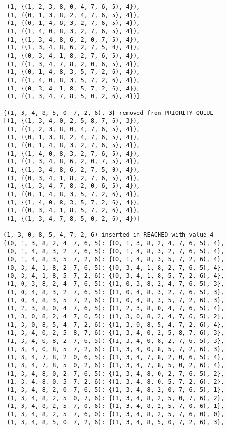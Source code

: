 \documentclass{article}
\begin{document}
\begin{verbatim}
 (1, {(1, 2, 3, 8, 0, 4, 7, 6, 5), 4}),
 (1, {(0, 1, 3, 8, 2, 4, 7, 6, 5), 4}),
 (1, {(0, 1, 4, 8, 3, 2, 7, 6, 5), 4}),
 (1, {(1, 4, 0, 8, 3, 2, 7, 6, 5), 4}),
 (1, {(1, 3, 4, 8, 6, 2, 0, 7, 5), 4}),
 (1, {(1, 3, 4, 8, 6, 2, 7, 5, 0), 4}),
 (1, {(0, 3, 4, 1, 8, 2, 7, 6, 5), 4}),
 (1, {(1, 3, 4, 7, 8, 2, 0, 6, 5), 4}),
 (1, {(0, 1, 4, 8, 3, 5, 7, 2, 6), 4}),
 (1, {(1, 4, 0, 8, 3, 5, 7, 2, 6), 4}),
 (1, {(0, 3, 4, 1, 8, 5, 7, 2, 6), 4}),
 (1, {(1, 3, 4, 7, 8, 5, 0, 2, 6), 4})]
---
{(1, 3, 4, 8, 5, 0, 7, 2, 6), 3} removed from PRIORITY QUEUE
[(1, {(1, 3, 4, 0, 2, 5, 8, 7, 6), 3}),
 (1, {(1, 2, 3, 8, 0, 4, 7, 6, 5), 4}),
 (1, {(0, 1, 3, 8, 2, 4, 7, 6, 5), 4}),
 (1, {(0, 1, 4, 8, 3, 2, 7, 6, 5), 4}),
 (1, {(1, 4, 0, 8, 3, 2, 7, 6, 5), 4}),
 (1, {(1, 3, 4, 8, 6, 2, 0, 7, 5), 4}),
 (1, {(1, 3, 4, 8, 6, 2, 7, 5, 0), 4}),
 (1, {(0, 3, 4, 1, 8, 2, 7, 6, 5), 4}),
 (1, {(1, 3, 4, 7, 8, 2, 0, 6, 5), 4}),
 (1, {(0, 1, 4, 8, 3, 5, 7, 2, 6), 4}),
 (1, {(1, 4, 0, 8, 3, 5, 7, 2, 6), 4}),
 (1, {(0, 3, 4, 1, 8, 5, 7, 2, 6), 4}),
 (1, {(1, 3, 4, 7, 8, 5, 0, 2, 6), 4})]
---
(1, 3, 0, 8, 5, 4, 7, 2, 6) inserted in REACHED with value 4
{(0, 1, 3, 8, 2, 4, 7, 6, 5): {(0, 1, 3, 8, 2, 4, 7, 6, 5), 4},
 (0, 1, 4, 8, 3, 2, 7, 6, 5): {(0, 1, 4, 8, 3, 2, 7, 6, 5), 4},
 (0, 1, 4, 8, 3, 5, 7, 2, 6): {(0, 1, 4, 8, 3, 5, 7, 2, 6), 4},
 (0, 3, 4, 1, 8, 2, 7, 6, 5): {(0, 3, 4, 1, 8, 2, 7, 6, 5), 4},
 (0, 3, 4, 1, 8, 5, 7, 2, 6): {(0, 3, 4, 1, 8, 5, 7, 2, 6), 4},
 (1, 0, 3, 8, 2, 4, 7, 6, 5): {(1, 0, 3, 8, 2, 4, 7, 6, 5), 3},
 (1, 0, 4, 8, 3, 2, 7, 6, 5): {(1, 0, 4, 8, 3, 2, 7, 6, 5), 3},
 (1, 0, 4, 8, 3, 5, 7, 2, 6): {(1, 0, 4, 8, 3, 5, 7, 2, 6), 3},
 (1, 2, 3, 8, 0, 4, 7, 6, 5): {(1, 2, 3, 8, 0, 4, 7, 6, 5), 4},
 (1, 3, 0, 8, 2, 4, 7, 6, 5): {(1, 3, 0, 8, 2, 4, 7, 6, 5), 2},
 (1, 3, 0, 8, 5, 4, 7, 2, 6): {(1, 3, 0, 8, 5, 4, 7, 2, 6), 4},
 (1, 3, 4, 0, 2, 5, 8, 7, 6): {(1, 3, 4, 0, 2, 5, 8, 7, 6), 3},
 (1, 3, 4, 0, 8, 2, 7, 6, 5): {(1, 3, 4, 0, 8, 2, 7, 6, 5), 3},
 (1, 3, 4, 0, 8, 5, 7, 2, 6): {(1, 3, 4, 0, 8, 5, 7, 2, 6), 3},
 (1, 3, 4, 7, 8, 2, 0, 6, 5): {(1, 3, 4, 7, 8, 2, 0, 6, 5), 4},
 (1, 3, 4, 7, 8, 5, 0, 2, 6): {(1, 3, 4, 7, 8, 5, 0, 2, 6), 4},
 (1, 3, 4, 8, 0, 2, 7, 6, 5): {(1, 3, 4, 8, 0, 2, 7, 6, 5), 2},
 (1, 3, 4, 8, 0, 5, 7, 2, 6): {(1, 3, 4, 8, 0, 5, 7, 2, 6), 2},
 (1, 3, 4, 8, 2, 0, 7, 6, 5): {(1, 3, 4, 8, 2, 0, 7, 6, 5), 1},
 (1, 3, 4, 8, 2, 5, 0, 7, 6): {(1, 3, 4, 8, 2, 5, 0, 7, 6), 2},
 (1, 3, 4, 8, 2, 5, 7, 0, 6): {(1, 3, 4, 8, 2, 5, 7, 0, 6), 1},
 (1, 3, 4, 8, 2, 5, 7, 6, 0): {(1, 3, 4, 8, 2, 5, 7, 6, 0), 0},
 (1, 3, 4, 8, 5, 0, 7, 2, 6): {(1, 3, 4, 8, 5, 0, 7, 2, 6), 3},

\end{verbatim}
\end{document}

